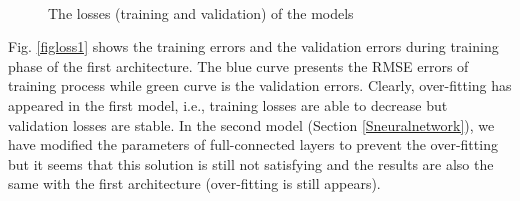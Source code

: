\documentclass[review]{elsarticle}
\begin{document}
\begin{figure}[htbp]
    \centering
    ~~
\\    
    \caption{The losses (training and validation) of the models}
    \label{figlosses}
\end{figure}

Fig. \ref{figloss1} shows the training errors and the validation errors during training phase of the first architecture. The blue curve presents the RMSE errors of training process while green curve is the validation errors. Clearly, over-fitting has appeared in the first model, i.e., training losses are able to decrease but validation losses are stable. In the second model (Section \ref{Sneuralnetwork}), we have modified the parameters of full-connected layers to prevent the over-fitting but it seems that this solution is still not satisfying and the results are also the same with the first architecture (over-fitting is still appears).
\end{document}
